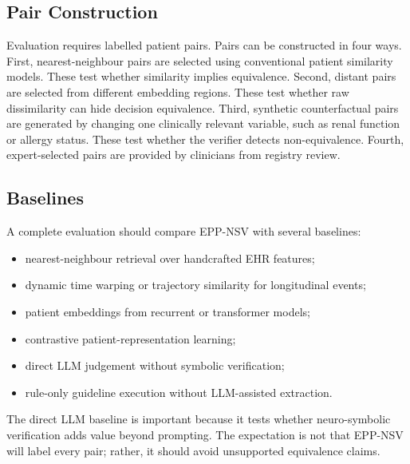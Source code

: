 \documentclass[english,5p,twocolumn,preprint]{elsarticle}
\begin{document}
\subsection{Pair Construction}
Evaluation requires labelled patient pairs. Pairs can be constructed in four ways. First, nearest-neighbour pairs are selected using conventional patient similarity models. These test whether similarity implies equivalence. Second, distant pairs are selected from different embedding regions. These test whether raw dissimilarity can hide decision equivalence. Third, synthetic counterfactual pairs are generated by changing one clinically relevant variable, such as renal function or allergy status. These test whether the verifier detects non-equivalence. Fourth, expert-selected pairs are provided by clinicians from registry review.

\subsection{Baselines}
A complete evaluation should compare EPP-NSV with several baselines:
\begin{itemize}[leftmargin=*]
    \item nearest-neighbour retrieval over handcrafted EHR features;
    \item dynamic time warping or trajectory similarity for longitudinal events;
    \item patient embeddings from recurrent or transformer models;
    \item contrastive patient-representation learning;
    \item direct LLM judgement without symbolic verification;
    \item rule-only guideline execution without LLM-assisted extraction.
\end{itemize}
The direct LLM baseline is important because it tests whether neuro-symbolic verification adds value beyond prompting. The expectation is not that EPP-NSV will label every pair; rather, it should avoid unsupported equivalence claims.
\end{document}
